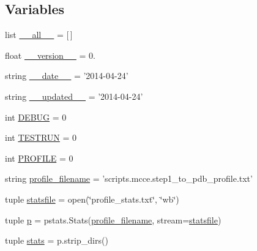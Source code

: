 \subsection*{Variables}
\begin{DoxyCompactItemize}
\item 
list \hyperlink{namespacestep1__to__pdb_aa69f205778c96b32ee4b45262a0338aa}{\-\_\-\-\_\-all\-\_\-\-\_\-} = \mbox{[}$\,$\mbox{]}
\item 
float \hyperlink{namespacestep1__to__pdb_a0e0c70e8561ad65054fcce206822b1c8}{\-\_\-\-\_\-version\-\_\-\-\_\-} = 0.
\item 
string \hyperlink{namespacestep1__to__pdb_a263cac53fc78edd6c1ed8cc2d8d1d32b}{\-\_\-\-\_\-date\-\_\-\-\_\-} = '2014-\/04-\/24'
\item 
string \hyperlink{namespacestep1__to__pdb_aa056e75d63fd41d9d4c342ac7e7dfa39}{\-\_\-\-\_\-updated\-\_\-\-\_\-} = '2014-\/04-\/24'
\item 
int \hyperlink{namespacestep1__to__pdb_a591354d4432ea8e5ce9bba8b7dc8ba1a}{D\-E\-B\-U\-G} = 0
\item 
int \hyperlink{namespacestep1__to__pdb_ac66d5feff2aae1ab64fcca1ab35a637c}{T\-E\-S\-T\-R\-U\-N} = 0
\item 
int \hyperlink{namespacestep1__to__pdb_ad76c59cb2cdd3d781f868a12529999ba}{P\-R\-O\-F\-I\-L\-E} = 0
\item 
string \hyperlink{namespacestep1__to__pdb_adc86c06ee1539131101783440ad9a108}{profile\-\_\-filename} = 'scripts.\-mcce.\-step1\-\_\-to\-\_\-pdb\-\_\-profile.\-txt'
\item 
tuple \hyperlink{namespacestep1__to__pdb_a2766ad30243ded186ba90c1d630c8caa}{statsfile} = open(\char`\"{}profile\-\_\-stats.\-txt\char`\"{}, \char`\"{}wb\char`\"{})
\item 
tuple \hyperlink{namespacestep1__to__pdb_a68130cab309339df09d927f67bb7ea84}{p} = pstats.\-Stats(\hyperlink{namespacestep1__to__pdb_adc86c06ee1539131101783440ad9a108}{profile\-\_\-filename}, stream=\hyperlink{namespacestep1__to__pdb_a2766ad30243ded186ba90c1d630c8caa}{statsfile})
\item 
tuple \hyperlink{namespacestep1__to__pdb_ad2df9fbec0d313239d036a67c94664fb}{stats} = p.\-strip\-\_\-dirs()
\end{DoxyCompactItemize}


